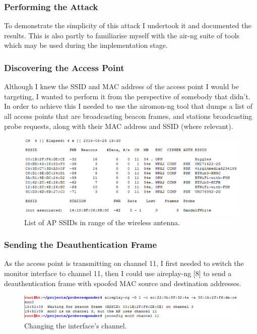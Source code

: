\subsubsection*{Performing the Attack}
To demonstrate the simplicity of this attack I undertook it and documented the results. This is also partly to familiarise myself with the air-ng suite of tools which may be used during the implementation stage. 

\subsubsection*{Discovering the Access Point}
Although I knew the SSID and MAC address of the access point I would be targeting, I wanted to perform it from the perspective of somebody that didn't. In order to achieve this I needed to use the airomon-ng tool that dumps a list of all access points that are broadcasting beacon frames, and stations broadcasting probe requests, along with their MAC address and SSID (where relevant).

\begin{figure}[h!]
\includegraphics[width=\linewidth]{research/attackvectors/figures/ddos-1.png}
\caption{List of AP SSIDs in range of the wireless antenna.}
\end{figure}

\subsubsection*{Sending the Deauthentication Frame}
As the access point is transmitting on channel 11, I first needed to switch the monitor interface to channel 11, then I could use aireplay-ng [8] to send a deauthentication frame with spoofed MAC source and destination addresses.

\begin{figure}[h!]
\includegraphics[width=\linewidth]{research/attackvectors/figures/ddos-2.png}
\caption{Changing the interface's channel.}
\end{figure}


